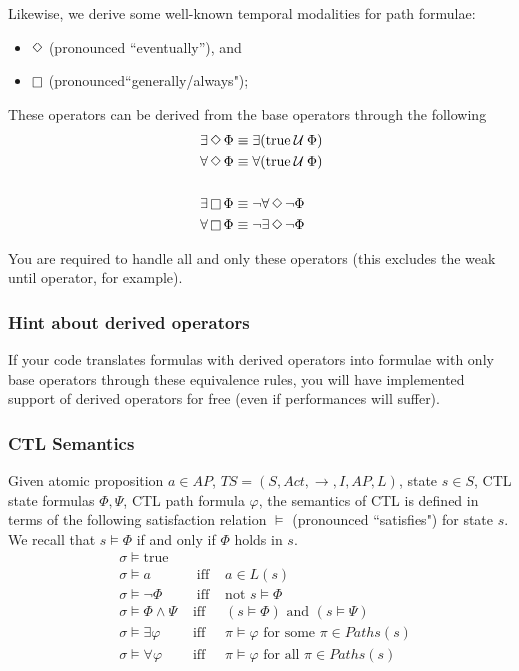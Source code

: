 \documentclass{article}
\begin{document}
Likewise, we derive some well-known temporal modalities for path formulae: 
\begin{itemize}
    \item $\mathop{\Diamond}$ (pronounced ``eventually''), and
    \item $\mathop{\square}$ (pronounced``generally/always");
\end{itemize}

These operators can be derived from the base operators through the following
\begin{align*}
    &\; \exists \mathop{\Diamond} \Phi \equiv \exists(\text{true} \mathbin{\mathcal{U}} \Phi) \\ 
    &\; \forall \mathop{\Diamond} \Phi \equiv \forall(\text{true} \mathbin{\mathcal{U}} \Phi) \\ 
    &\; \\ 
    &\; \exists \mathop{\square} \Phi \equiv \neg\forall \mathop{\Diamond} \neg\Phi \\ 
    &\; \forall \mathop{\square} \Phi \equiv \neg\exists \mathop{\Diamond} \neg\Phi \\
\end{align*}

You are required to handle all and only these operators (this excludes the weak until operator, for example).

\subsubsection*{Hint about derived operators}
If your code translates formulas with derived operators into formulae 
with only base operators through these equivalence rules, you will have implemented support of 
derived operators for free (even if performances will suffer).

\subsubsection*{CTL Semantics}
Given atomic proposition $a \in AP$, $TS = (S, Act, \rightarrow, I, AP, L)$, state $s \in S$, CTL state formulas $\Phi, \Psi$, CTL path formula $\varphi$, the semantics of CTL is defined in terms of the following satisfaction relation $\vDash$ (pronounced ``satisfies") for state $s$. We recall that $s \vDash \Phi$ if and only if $\Phi$ holds in $s$.
\begin{align*}
     & \sigma \vDash \text{true} & \\
     & \sigma \vDash a &\; \text{ iff } & a \in L(s) \\ 
     & \sigma \vDash \neg \Phi &\; \text{ iff } & \text{not } s \vDash \Phi \\
     & \sigma \vDash \Phi \land \Psi & \text{ iff }&  (s \vDash \Phi) \text{ and } (s \vDash \Psi) \\
     & \sigma \vDash \exists \varphi & \text{ iff } & \pi \vDash \varphi \text{ for some } \pi \in Paths(s) \\ 
     & \sigma \vDash \forall \varphi & \text{ iff }& \pi \vDash \varphi \text{ for all } \pi \in Paths(s) \\ 
\end{align*}
\end{document}
